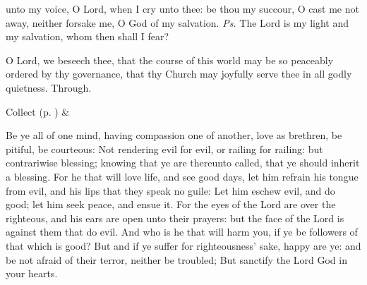 
\introit
{} unto my voice, O Lord, when I cry unto thee: be thou my succour, O cast me not away, neither forsake me, O God of my salvation. \textit{Ps.} The Lord is my light and my salvation, whom then shall I fear?

\collect
{} O Lord, we beseech thee, that the course of this world may be so peaceably ordered by thy governance, that thy Church may joyfully serve thee in all godly quietness. Through.
\begin{rubric}
     Collect  (p. \pageref{SPSaints}) \&  
\end{rubric}
 Be ye all of one mind, having compassion one of another, love as brethren, be pitiful, be courteous: Not rendering evil for evil, or railing for railing: but contrariwise blessing; knowing that ye are thereunto called, that ye should inherit a blessing. For he that will love life, and see good days, let him refrain his tongue from evil, and his lips that they speak no guile: Let him eschew evil, and do good; let him seek peace, and ensue it. For the eyes of the Lord are over the righteous, and his ears are open unto their prayers: but the face of the Lord is against them that do evil. And who is he that will harm you, if ye be followers of that which is good? But and if ye suffer for righteousness' sake, happy are ye: and be not afraid of their terror, neither be troubled; But sanctify the Lord God in your hearts.


